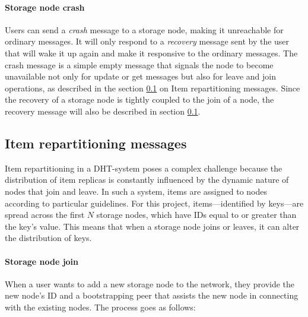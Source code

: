 \documentclass[a4paper, 11pt]{article}
\begin{document}
\paragraph{Storage node crash} Users can send a \textit{crash} message to a storage node, making it unreachable for ordinary messages. It will only respond to a \textit{recovery} message sent by the user that will wake it up again and make it responsive to the ordinary messages. The crash message is a simple empty message that signals the node to become unavailable not only for update or get messages but also for leave and join operations, as described in the section \ref{Repartitioning_Messages} on Item repartitioning messages. Since the recovery of a storage node is tightly coupled to the join of a node, the recovery message will also be described in section \ref{Repartitioning_Messages}.

\subsection{Item repartitioning messages}\label{Repartitioning_Messages}

Item repartitioning in a DHT-system poses a complex challenge because the distribution of item replicas is constantly influenced by the dynamic nature of nodes that join and leave. In such a system, items are assigned to nodes according to particular guidelines. For this project, items—identified by keys—are spread across the first $N$ storage nodes, which have IDs equal to or greater than the key's value. This means that when a storage node joins or leaves, it can alter the distribution of keys.

\paragraph{Storage node join} When a user wants to add a new storage node to the network, they provide the new node's ID and a bootstrapping peer that assists the new node in connecting with the existing nodes. The process goes as follows:
\end{document}

